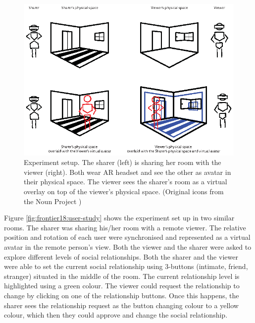 \begin{figure}
    \begin{center}
    \includegraphics[width=\linewidth]{images/54-hiding-frontier18/images-23.eps}
    \caption{Experiment setup. The sharer (left) is sharing her room with the viewer (right). Both wear AR headset and see the other as avatar in their physical space. The viewer sees the sharer's room as a virtual overlay on top of the viewer's physical space. (Original icons from the Noun Project \cite{TheNounProjectInc.})}
    \label{fig:frontier18:setup}
    \end{center}
\end{figure}

Figure \ref{fig:frontier18:user-study} shows the experiment set up in two similar rooms. The sharer was sharing his/her room with a remote viewer. The relative position and rotation of each user were synchronised and represented as a virtual avatar in the remote person's view. 
Both the viewer and the sharer were asked to explore different levels of social relationships. Both the sharer and the viewer were able to set the current social relationship using 3-buttons (intimate, friend, stranger) situated in the middle of the room. The current relationship level is highlighted using a green colour. The viewer could request the relationship to change by clicking on one of the relationship buttons. Once this happens, the sharer sees the relationship request as the button changing colour to a yellow colour, which then they could approve and change the social relationship.

